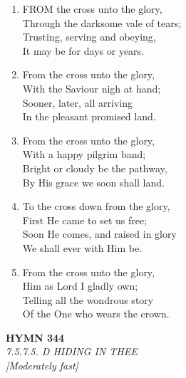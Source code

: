\begin{enumerate}
    \item FROM the cross unto the glory, \\
        Through the darksome vale of tears; \\
        Trusting, serving and obeying, \\
        It may be for days or years.

    \item From the cross unto the glory, \\
        With the Saviour nigh at hand; \\
        Sooner, later, all arriving \\
        In the pleasant promised land.

    \item From the cross unto the glory, \\
        With a happy pilgrim band; \\
        Bright or cloudy be the pathway, \\
        By His grace we soon shall land.

    \item To the cross down from the glory, \\
        First He came to set us free; \\
        Soon He comes, and raised in glory \\
        We shall ever with Him be.

    \item From the cross unto the glory, \\
        Him as Lord I gladly own; \\
        Telling all the wondrous story \\
        Of the One who wears the crown.

\end{enumerate}

\newpage
\begin{center}
    {\Large \textbf{HYMN 344}}
    \\
    \textit{7.5.7.5. D HIDING IN THEE}
    \\
    \textit{\small [Moderately fast]}
\end{center}
\vspace{1em}

